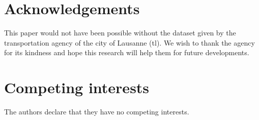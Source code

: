 \documentclass{bmcart}
\begin{document}

\begin{backmatter}

\section*{Acknowledgements}%
This paper would not have been possible without the dataset given by the transportation agency of the city of Lausanne (tl). We wish to thank the agency for its kindness and hope this research will help them for future developments.

\section*{Competing interests}
The authors declare that they have no competing interests.



\end{backmatter}
\end{document}
